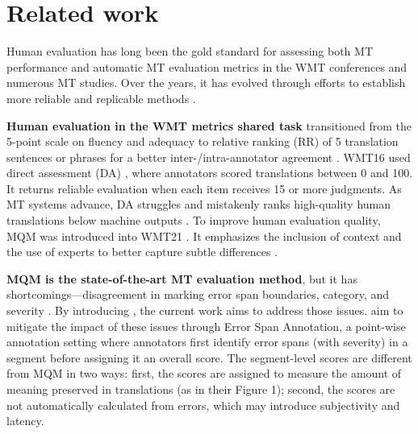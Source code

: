 \section{Related work}

Human evaluation has long been the gold standard for assessing both MT performance and automatic MT evaluation metrics in the WMT conferences and numerous MT studies. Over the years, it has evolved through efforts to establish more reliable and replicable methods \citep{stanchev-etal-2020-towards}.

\noindent \textbf{Human evaluation in the WMT metrics shared task} transitioned from the 5-point scale on fluency and adequacy \citep{koehn-monz:2006:WMT} to relative ranking (RR) of 5 translation sentences or phrases \citep{callison-burch-etal-2007-meta} for a better inter-/intra-annotator agreement \citep{callison-burch-etal-2007-meta, callison-burch-etal-2008-meta}. WMT16 \citep{bojar-etal-2016-results} used direct assessment (DA) \citep{graham-etal-2013-continuous, graham-etal-2016-glitters, GRAHAM_BALDWIN_MOFFAT_ZOBEL_2017}, where annotators scored translations between 0 and 100. It returns reliable evaluation when each item receives 15 or more judgments. As MT systems advance, DA struggles and mistakenly ranks high-quality human translations below machine outputs \citep{freitag-etal-2021-results}.
To improve human evaluation quality, MQM \citep{lommel2014mqm, freitag-etal-2021-experts} was introduced into WMT21 \citep{freitag-etal-2021-results}. It emphasizes the inclusion of context \citep{mathur-etal-2020-results} and the use of experts to better capture subtle differences \citep{goto-etal-2014-crowdsourcing, toral-etal-2018-attaining, Lubli2020ASO}. 

\noindent \textbf{MQM is the state-of-the-art MT evaluation method}, but it has shortcomings---disagreement in marking error span boundaries, category, and severity \citep{lommel2014assessing}. By introducing \sxsmqm, the current work aims to address those issues. \citet{kocmi2024esa} aim to mitigate the impact of these issues through Error Span Annotation, a point-wise annotation setting where annotators first identify error spans (with severity) in a segment before assigning it an overall score. The segment-level scores are different from MQM in two ways: first, the scores are assigned to measure the amount of meaning preserved in translations (as in their Figure 1); second, the scores are not automatically calculated from errors, which may introduce subjectivity and latency.

